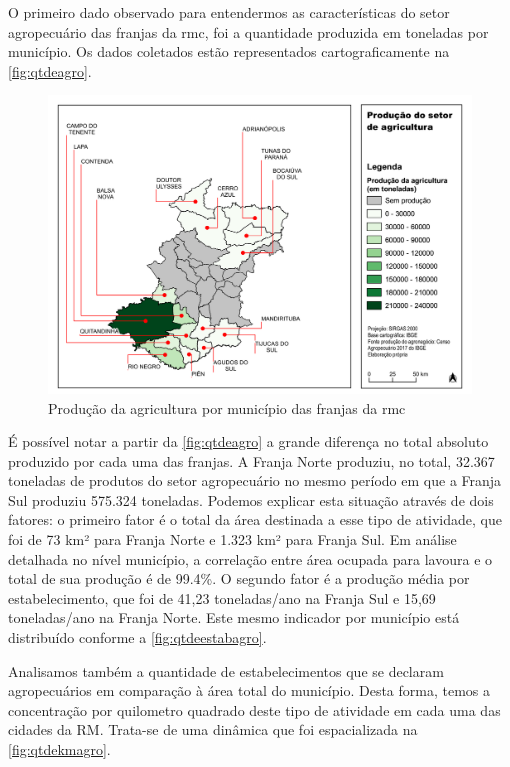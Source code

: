 	O primeiro dado observado para entendermos as características do setor agropecuário das franjas da \glsdesc{rmc}, foi a quantidade produzida em toneladas por município. Os dados coletados estão representados cartograficamente na \autoref{fig:qtdeagro}.
	
	\begin{landscape}
		\begin{figure}
			\centering
			\caption{Produção da agricultura por município das franjas da \gls{rmc}}
			\label{fig:qtdeagro}
			\includegraphics[width=0.85\linewidth]{../gis/produtos/RMC_censorural_QTDE_PRODUZIDA_AGRO}
		\end{figure}
	\end{landscape}
	
	É possível notar a partir da \autoref{fig:qtdeagro} a grande diferença no total absoluto produzido por cada uma das franjas. A Franja Norte produziu, no total, 32.367 toneladas de produtos do setor agropecuário no mesmo período em que a Franja Sul produziu 575.324 toneladas. Podemos explicar esta situação através de dois fatores: o primeiro fator é o total da área destinada a esse tipo de atividade, que foi de 73 km² para Franja Norte e 1.323 km² para Franja Sul. Em análise detalhada no nível município, a correlação entre área ocupada para lavoura e o total de sua produção é de 99.4\%. O segundo fator é a produção média por estabelecimento, que foi de 41,23 toneladas/ano na Franja Sul e 15,69 toneladas/ano na Franja Norte. Este mesmo indicador por município está distribuído conforme a \autoref{fig:qtdeestabagro}.
	
	Analisamos também a quantidade de estabelecimentos que se declaram agropecuários em comparação à área total do município. Desta forma, temos a concentração por quilometro quadrado deste tipo de atividade em cada uma das cidades da RM. Trata-se de uma dinâmica que foi espacializada na \autoref{fig:qtdekmagro}.
	

